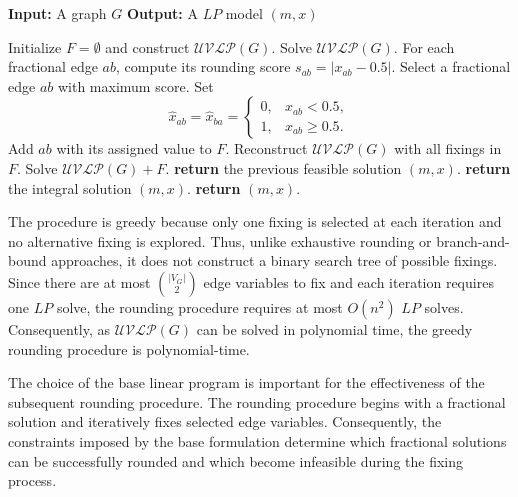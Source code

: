\documentclass[11pt]{report}
\begin{document}
\begin{algorithm} \caption{Greedy $LP$ Rounding} \label{algo::greedy_rounding}
  \begin{algorithmic}[1]
    \State \textbf{Input:} A graph $G$
    \State \textbf{Output:} A $LP$ model $(m,x)$

    \vspace{0.5em}

    \State Initialize $F=\emptyset$ and construct $\mathcal{UVLP}(G)$.
    \State Solve $\mathcal{UVLP}(G)$.
      \State For each fractional edge $ab$, compute its rounding score $ s_{ab}=|x_{ab}-0.5|$.
      \State Select a fractional edge $ab$ with maximum score.
      \State Set
      \[
      \widehat{x}_{ab}=\widehat{x}_{ba}=
      \begin{cases}
      0, & x_{ab} < 0.5,\\
      1, & x_{ab} \geq 0.5.
      \end{cases}
      \]
      \State Add $ab$ with its assigned value to $F$.
      \State Reconstruct $\mathcal{UVLP}(G)$ with all fixings in $F$.
      \State Solve $\mathcal{UVLP}(G) + F$.
          \State \textbf{return} the previous feasible solution $(m,x)$.
      \EndIf
          \State \textbf{return} the integral solution $(m,x)$.
      \EndIf
    \EndWhile
    \State \textbf{return} $(m,x)$.
  \end{algorithmic}
\end{algorithm}

The procedure is greedy because only one fixing is selected at each iteration and no alternative fixing is explored. Thus, unlike exhaustive rounding or branch-and-bound approaches, it does not construct a binary search tree of possible fixings. Since there are at most $\binom{|V_G|}{2}$ edge variables to fix and each iteration requires one $LP$ solve, the rounding procedure requires at most $O(n^2)$ $LP$ solves. Consequently, as $\mathcal{UVLP}(G)$ can be solved in polynomial time, the greedy rounding procedure is polynomial-time.

The choice of the base linear program is important for the effectiveness of the subsequent rounding procedure. The rounding procedure begins with a fractional solution and iteratively fixes selected edge variables. Consequently, the constraints imposed by the base formulation determine which fractional solutions can be successfully rounded and which become infeasible during the fixing process.
\end{document}
